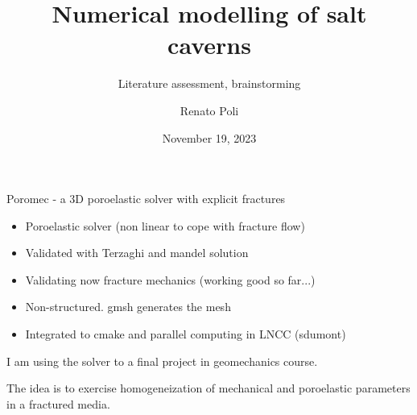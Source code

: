 

\usepackage{graphicx}
\graphicspath{ {../multimedia/} }


\title[Num modelling of salt caverns]{Numerical modelling of salt caverns}
\subtitle{Literature assessment, brainstorming}
\author[RPoli]{Renato Poli}
\date{November 19, 2023}



\maketitle


\begin{frame}{Poromec - a 3D poroelastic solver with explicit fractures}
\begin{itemize}
	\item Poroelastic solver (non linear to cope with fracture flow)
	\item Validated with Terzaghi and mandel solution
	\item Validating now fracture mechanics (working good so far...)
	\item Non-structured. gmsh generates the mesh
	\item Integrated to cmake and parallel computing in LNCC (sdumont)
\end{itemize}
\vspace{10pt}
I am using the solver to a final project in geomechanics course.

The idea is to exercise homogeneization of mechanical and poroelastic parameters in a fractured media.
\end{frame}

